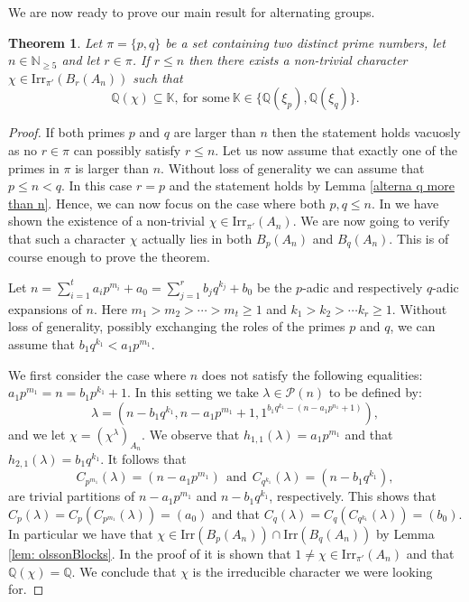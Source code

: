 \documentclass[a4paper,12pt,leqno]{amsart}
\newcommand{\6}{^}
\newtheorem{thm}[subsection]{Theorem}
\theoremstyle{definition}
\theoremstyle{definition}
\theoremstyle{definition}
\theoremstyle{definition}
\theoremstyle{definition}
\begin{document}
We are now ready to prove our main result for alternating groups. 

\begin{thm}\label{thm:alternating}
Let $\pi=\{p,q\}$ be a set containing two distinct prime numbers, let $n\in\mathbb{N}_{\geq 5}$ and let $r\in \pi$.
If $r\leq n$ then there exists a non-trivial character $\chi\in\mathrm{Irr}_{\pi'}(B_r(A_n))$ such that 
$$\mathbb{Q}(\chi)\subseteq \mathbb{K},\ \text{for some}\ \mathbb{K}\in\{\mathbb{Q}(\xi_p), \mathbb{Q}(\xi_q)\}.$$
\end{thm}
\begin{proof}
If both primes $p$ and $q$ are larger than $n$ then the statement holds vacuosly as no $r\in\pi$ can possibly satisfy $r\leq n$. 
Let us now assume that exactly one of the primes in $\pi$ is larger than $n$. Without loss of generality we can assume that $p\leq n<q$. In this case $r=p$ and the statement holds by Lemma \ref{alterna q more than n}. 
Hence, we can now focus on the case where both $p,q\leq n$. 
In \cite[Theorem D]{GHSV21} we have shown the existence of a non-trivial $\chi\in\mathrm{Irr}_{\pi'}(A_n)$. We are now going to verify that such a character $\chi$ actually lies in both $B_p(A_n)$ and $B_q(A_n)$. This is of course enough to prove the theorem. 

Let $n=\sum_{i=1}\6{t}a_ip\6{m_i}+a_0=\sum_{j=1}\6{r}b_jq\6{k_j}+b_0$ be the
$p$-adic and respectively $q$-adic expansions of $n$. Here
$m_1>m_2>\cdots >m_t\geq 1$ and $k_1>k_2>\cdots k_r\geq 1$. Without
loss of generality, possibly exchanging the roles of the primes $p$ and $q$, we can assume that $b_1q\6{k_1}<a_1p\6{m_1}$. 

We first
consider the case where $n$ does not satisfy the following equalities: $a_1p\6{m_1}=n=b_1p\6{k_1}+1$. 
In this setting we take $\lambda\in\mathcal{P}(n)$ to be defined by:
$$\lambda=(n-b_1q^{k_1}, n-a_1p^{m_1}+1, 1^{b_1q^{k_1}-(n-a_1p^{n_1}+1)}),$$
and we let $\chi=(\chi\6\lambda)_{A_n}$. We observe that $h_{1,1}(\lambda)=a_1p\6{m_1}$ and that $h_{2,1}(\lambda)=b_1q\6{k_1}$. It follows that 
$$C_{p\6{m_1}}(\lambda)=(n-a_1p\6{m_1})\ \ \text{and}\ \ C_{q\6{k_1}}(\lambda)=(n-b_1q\6{k_1}),$$
are trivial partitions of $n-a_1p\6{m_1}$ and $n-b_1q\6{k_1}$, respectively. 
This shows that $C_p(\lambda)=C_p(C_{p\6{m_1}}(\lambda))=(a_0)$ and that $C_q(\lambda)=C_q(C_{q\6{k_1}}(\lambda))=(b_0)$. In particular we have that $\chi\in\mathrm{Irr}(B_p(A_n))\cap \mathrm{Irr}(B_q(A_n))$ by Lemma \ref{lem: olssonBlocks}. In the proof of \cite[Theorem D]{GHSV21} it is shown that $1\neq \chi\in\mathrm{Irr}_{\pi'}(A_n)$ and that $\mathbb{Q}(\chi)=\mathbb{Q}$. We conclude that $\chi$ is the irreducible character we were looking for. 


\end{proof}
\end{document}
